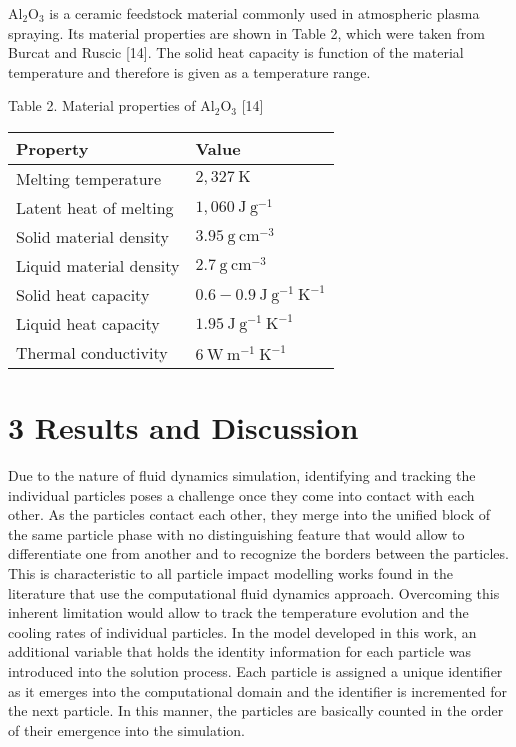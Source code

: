 \documentclass[10pt]{article}
\begin{document}
$\mathrm{Al}_{2} \mathrm{O}_{3}$ is a ceramic feedstock material commonly used in atmospheric plasma spraying. Its material properties are shown in Table 2, which were taken from Burcat and Ruscic [14]. The solid heat capacity is function of the material temperature and therefore is given as a temperature range.

Table 2. Material properties of $\mathrm{Al}_{2} \mathrm{O}_{3}$ [14]

\begin{center}
\begin{tabular}{l|l}
\hline
Property & Value \\
\hline
Melting temperature & $2,327 \mathrm{~K}$ \\
\hline
Latent heat of melting & $1,060 \mathrm{~J} \mathrm{~g}^{-1}$ \\
\hline
Solid material density & $3.95 \mathrm{~g} \mathrm{~cm}^{-3}$ \\
\hline
Liquid material density & $2.7 \mathrm{~g} \mathrm{~cm}^{-3}$ \\
\hline
Solid heat capacity & $0.6-0.9 \mathrm{~J} \mathrm{~g}^{-1} \mathrm{~K}^{-1}$ \\
\hline
Liquid heat capacity & $1.95 \mathrm{~J} \mathrm{~g}^{-1} \mathrm{~K}^{-1}$ \\
\hline
Thermal conductivity & $6 \mathrm{~W} \mathrm{~m}^{-1} \mathrm{~K}^{-1}$ \\
\hline
\end{tabular}
\end{center}

\section*{3 Results and Discussion}
Due to the nature of fluid dynamics simulation, identifying and tracking the individual particles poses a challenge once they come into contact with each other. As the particles contact each other, they merge into the unified block of the same particle phase with no distinguishing feature that would allow to differentiate one from another and to recognize the borders between the particles. This is characteristic to all particle impact modelling works found in the literature that use the computational fluid dynamics approach. Overcoming this inherent limitation would allow to track the temperature evolution and the cooling rates of individual particles. In the model developed in this work, an additional variable that holds the identity information for each particle was introduced into the solution process. Each particle is assigned a unique identifier as it emerges into the computational domain and the identifier is incremented for the next particle. In this manner, the particles are basically counted in the order of their emergence into the simulation.
\end{document}
